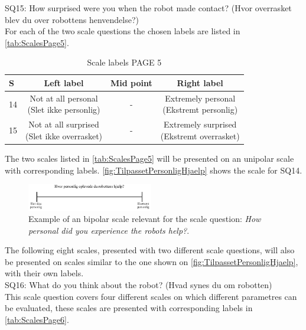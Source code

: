 SQ15: How surprised were you when the robot made contact? (Hvor overrasket blev du over robottens henvendelse?)\\
For each of the two scale questions the chosen labels are listed in \autoref{tab:ScalesPage5}. 
%
\begin{table}[H]
	\centering
\caption{Scale labels PAGE 5}
	\label{tab:ScalesPage5} 
	\begin{tabular}{l|c|c|c}
		S     & Left label & Mid point & Right label \\\hline
		14   & \makecell{Not at all personal\\(Slet ikke personlig)}  & - & \makecell{Extremely personal\\(Ekstremt personlig)}        \\\hline
		15   & \makecell{Not at all surprised\\(Slet ikke overrasket)} & - & \makecell{Extremely surprised \\(Ekstremt overrasket)}               
	\end{tabular}        
\end{table}
\noindent
%
The two scales listed in \autoref{tab:ScalesPage5} will be presented on an unipolar scale with corresponding labels. \autoref{fig:TilpassetPersonligHjaelp} shows the scale for SQ14. 
%
\begin{figure}[H]
\centering
\includegraphics[width = 0.49\textwidth]{Figure/TilpassetPersonligHjaelp}
\setlength{} 
\caption{Example of an bipolar scale relevant for the scale question: \textit{How personal did you experience the robots help?}.}
\label{fig:TilpassetPersonligHjaelp}
\end{figure}
\noindent
% 
The following eight scales, presented with two different scale questions, will also be presented on scales similar to the one shown on \autoref{fig:TilpassetPersonligHjaelp}, with their own labels. \\  
SQ16: What do you think about the robot? (Hvad synes du om robotten)\\
This scale question covers four different scales on which different parametres can be evaluated, these scales are presented with corresponding labels in \autoref{tab:ScalesPage6}. 
%
